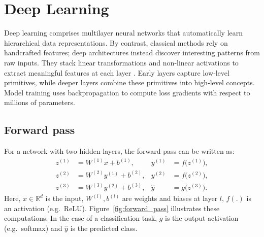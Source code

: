 \section{Deep Learning}
\label{sec:deep_learning}

Deep learning comprises multilayer neural networks that automatically learn hierarchical data representations. By contrast, classical methods rely on handcrafted features; deep architectures instead discover interesting patterns from raw inputs. They stack linear transformations and non‑linear activations to extract meaningful features at each layer \cite{lecun_deep_learning_2015}. 
Early layers capture low‑level primitives, while deeper layers combine these primitives into high‑level concepts. Model training uses backpropagation to compute loss gradients with respect to millions of parameters. %

\subsection{Forward pass}
For a network with two hidden layers, the forward pass can be written as:
\begin{align}
z^{(1)} &= W^{(1)} x + b^{(1)}, & y^{(1)} &= f\bigl(z^{(1)}\bigr), \\
z^{(2)} &= W^{(2)} y^{(1)} + b^{(2)}, & y^{(2)} &= f\bigl(z^{(2)}\bigr), \\
z^{(3)} &= W^{(3)} y^{(2)} + b^{(3)}, & \hat{y} &= g\bigl(z^{(3)}\bigr).
\end{align}
Here, \(x\in\mathbb{R}^d\) is the input, \(W^{(l)},b^{(l)}\) are weights and biases at layer \(l\), \(f(.)\) is an activation (e.g.\ ReLU). Figure~\ref{fig:forward_pass} illustrates these computations. In the case of a classification task, \(g\) is the output activation (e.g.\ softmax) and \(\hat{y}\) is the predicted class.


